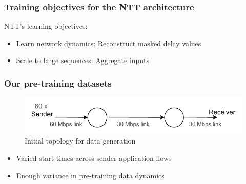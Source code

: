 \documentclass{beamer}
\begin{document}
\begin{frame}
\frametitle{Training objectives for the NTT architecture}

NTT's learning objectives: 
\pause 
\begin{itemize}
    \item<1-> \alert{Learn network dynamics:}  Reconstruct masked delay values
    \pause
    \item<1-> \alert{Scale to large sequences:}  Aggregate inputs
    \end{itemize}
\end{frame}



\begin{frame}
\frametitle{Our pre-training datasets}


\begin{figure}[h]
  \begin{center}
    \includegraphics[scale=0.8]{figures/simple_topo.pdf}
    \caption{Initial topology for data generation}
    \label{fig:topo}
  \end{center}
\end{figure}
 
 \pause

\begin{itemize}
    \item<1-> Varied start times across sender application flows
    \item<1-> Enough variance in pre-training data dynamics 
    \end{itemize}

\end{frame}
\end{document}
